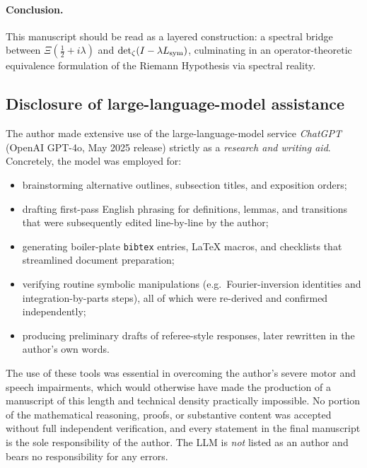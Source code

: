 \paragraph*{Conclusion.}
This manuscript should be read as a layered construction: a spectral bridge between \( \Xi(\tfrac{1}{2} + i\lambda) \) and \( \det\nolimits_{\zeta}(I - \lambda L_{\mathrm{sym}}) \), culminating in an operator-theoretic equivalence formulation of the Riemann Hypothesis via spectral reality.

\subsection*{Disclosure of large-language-model assistance}
The author made extensive use of the large-language-model service
\emph{ChatGPT} (OpenAI GPT-4o, May 2025 release) strictly as a
\emph{research and writing aid}.  Concretely, the model was employed
for:
\begin{itemize}
  \item brainstorming alternative outlines, subsection titles, and
        exposition orders;
  \item drafting first-pass English phrasing for definitions,
        lemmas, and transitions that were subsequently edited
        line-by-line by the author;
  \item generating boiler-plate \texttt{bibtex} entries,
        \LaTeX{} macros, and checklists that streamlined
        document preparation;
  \item verifying routine symbolic manipulations
        (e.g.\ Fourier-inversion identities and
        integration-by-parts steps), all of which were
        re-derived and confirmed independently;
  \item producing preliminary drafts of referee-style responses,
        later rewritten in the author’s own words.
\end{itemize}
The use of these tools was essential in overcoming the author’s severe
motor and speech impairments, which would otherwise have made the
production of a manuscript of this length and technical density
practically impossible.  No portion of the mathematical reasoning,
proofs, or substantive content was accepted without full independent
verification, and every statement in the final manuscript is the sole
responsibility of the author.  The LLM is \emph{not} listed as an
author and bears no responsibility for any errors.